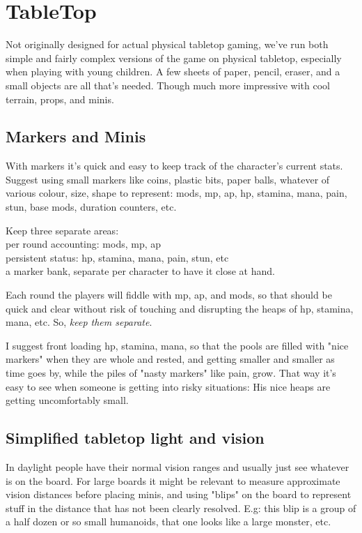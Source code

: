 
\section*{TableTop}
Not originally designed for actual physical tabletop gaming, we've run both simple and fairly complex versions of the game on physical tabletop, especially when playing with young children.
A few sheets of paper, pencil, eraser, and a small objects are all that's needed. Though much more impressive with cool terrain, props, and minis.


\subsection*{Markers and Minis}
With markers it's quick and easy to keep track of the character's current stats. Suggest using small markers like coins, plastic bits, paper balls, whatever of various colour, size, shape to represent: mods, mp, ap, hp, stamina, mana, pain, stun, base mods, duration counters, etc.

Keep three separate areas:\\
per round accounting: mods, mp, ap\\
persistent status: hp, stamina, mana, pain, stun, etc\\
a marker bank, separate per character to have it close at hand.

Each round the players will fiddle with mp, ap, and mods, so that should be quick and clear without risk of touching and disrupting the heaps of hp, stamina, mana, etc. So, \emph{keep them separate}.

I suggest front loading hp, stamina, mana, so that the pools are filled with "nice markers" when they are whole and rested, and getting smaller and smaller as time goes by, while the piles of "nasty markers" like pain, grow. That way it's easy to see when someone is getting into risky situations: His nice heaps are getting uncomfortably small.


\subsection*{Simplified tabletop light and vision}
In daylight people have their normal vision ranges and usually just see whatever is on the board. For large boards it might be relevant to measure approximate vision distances before placing minis, and using "blips" on the board to represent stuff in the distance that has not been clearly resolved. E.g: this blip is a group of a half dozen or so small humanoids, that one looks like a large monster, etc.

